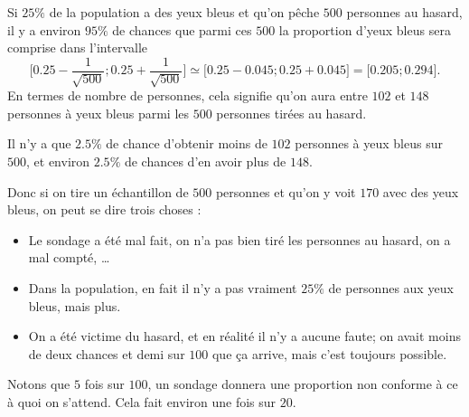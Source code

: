 \begin{example}
    Si \( 25\%\) de la population a des yeux bleus et qu'on pêche \( 500\) personnes au hasard, il y a environ \( 95\%\) de chances que parmi ces \( 500\) la proportion d'yeux bleus sera comprise dans l'intervalle
    \begin{equation}
        \mathopen[ 0.25-\frac{1}{ \sqrt{500} } ; 0.25+\frac{1}{ \sqrt{500} } \mathclose]\simeq\mathopen[ 0.25-0.045 ; 0.25+0.045 \mathclose]=\mathopen[ 0.205 ; 0.294 \mathclose].
    \end{equation}
    En termes de nombre de personnes, cela signifie qu'on aura entre \( 102\) et \( 148\) personnes à yeux bleus parmi les \( 500\) personnes tirées au hasard.

    Il n'y a que \( 2.5\%\) de chance d'obtenir moins de \( 102\) personnes à yeux bleus sur \( 500\), et environ \( 2.5\%\) de chances d'en avoir plus de \( 148\).

    Donc si on tire un échantillon de \( 500\) personnes et qu'on y voit $170$ avec des yeux bleus, on peut se dire trois choses :
    \begin{itemize}
        \item Le sondage a été mal fait, on n'a pas bien tiré les personnes au hasard, on a mal compté, \ldots
        \item Dans la population, en fait il n'y a pas vraiment \( 25\%\) de personnes aux yeux bleus, mais plus.
        \item On a été victime du hasard, et en réalité il n'y a aucune faute; on avait moins de deux chances et demi sur \( 100\) que ça arrive, mais c'est toujours possible.
    \end{itemize}
    Notons que \( 5\) fois sur \( 100\), un sondage donnera une proportion non conforme à ce à quoi on s'attend. Cela fait environ une fois sur \( 20\).
\end{example}


